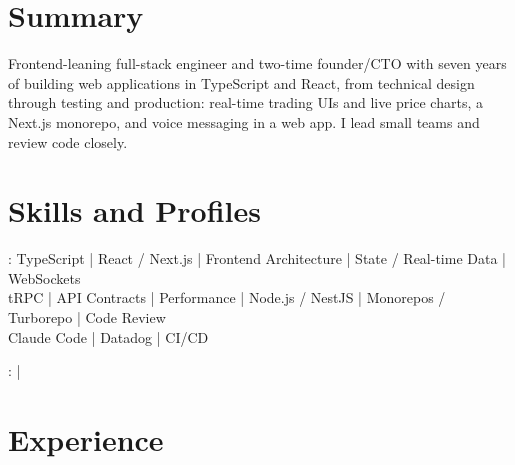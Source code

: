 \documentclass[print]{jack-resume}
\begin{document}
\pagecolor{darkmodeBackground}


\begin{minipage}[t][1cm][t]{.03\textwidth}
    \hfill
\end{minipage}

\section{Summary}
Frontend-leaning full-stack engineer and two-time founder/CTO with seven years of building web applications in TypeScript and React, from technical design through testing and production: real-time trading UIs and live price charts, a Next.js monorepo, and voice messaging in a web app. I lead small teams and review code closely.
\sectionsep

\section{Skills and Profiles}
:
TypeScript \hfill | \hfill
React / Next.js \hfill | \hfill
Frontend Architecture \hfill | \hfill
State / Real-time Data \hfill | \hfill
WebSockets \\
\hspace{1.0cm} tRPC \hfill | \hfill
API Contracts \hfill | \hfill
Performance \hfill | \hfill
Node.js / NestJS \hfill | \hfill
Monorepos / Turborepo \hfill | \hfill
Code Review \\
\hspace{1.0cm} Claude Code \hfill | \hfill
Datadog \hfill | \hfill
CI/CD \\

\raggedright{
    :
      \href{https://www.linkedin.com/in/jack-sturtevant/}{ \ExternalLink} |
     \href{https://github.com/jacksturt}{ \ExternalLink}}

\section{Experience}
\end{document}
